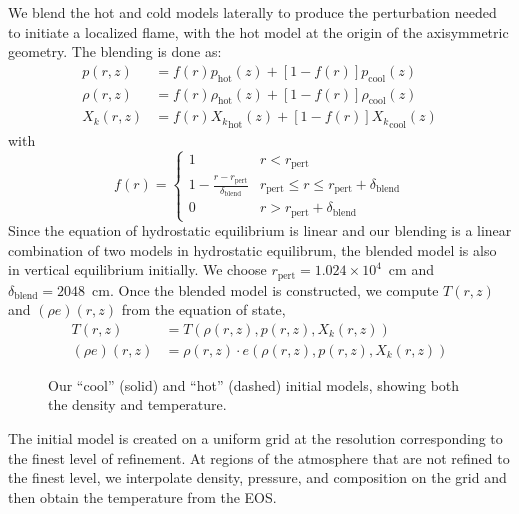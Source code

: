 \documentclass[trackchanges,preprint,times,tighten]{aastex63}
\begin{document}
We blend the hot and cold models laterally to produce the perturbation
needed to initiate a localized flame, with the hot model at the
origin of the axisymmetric geometry.  The blending is done as:
\begin{align}
p(r,z) &= f(r) p_\mathrm{hot}(z) + [1-f(r)] p_\mathrm{cool}(z) \\
\rho(r,z) &= f(r) \rho_\mathrm{hot}(z) + [1-f(r)] \rho_\mathrm{cool}(z) \\
X_k(r,z) &= f(r) {X_k}_\mathrm{hot}(z) + [1-f(r)] {X_k}_\mathrm{cool}(z)
\end{align}
with
\begin{equation}
f(r) = \begin{cases}
     1 & r < r_\mathrm{pert} \\
   1 - \frac{r - r_\mathrm{pert}}{\delta_\mathrm{blend}} & r_\mathrm{pert} \le r \le r_\mathrm{pert} + \delta_\mathrm{blend} \\
     0 & r > r_\mathrm{pert} + \delta_\mathrm{blend}
\end{cases}
\end{equation}
Since the equation of hydrostatic equilibrium is linear and our
blending is a linear combination of two models in hydrostatic
equilibrum, the blended model is also in vertical equilibrium initially.  We choose
$r_\mathrm{pert} = 1.024\times 10^4$~cm and $\delta_\mathrm{blend} = 2048$~cm.  Once
the blended model is constructed, we compute $T(r,z)$ and $(\rho e)(r,z)$
from the equation of state,
\begin{align}
  T(r,z) &= T(\rho(r,z), p(r,z), X_k(r,z)) \\
  (\rho e)(r,z) &= \rho(r, z) \cdot e(\rho(r,z), p(r,z), X_k(r,z)) 
\end{align}

\begin{figure}[t]
\centering
{}
\caption{\label{fig:initial_models} Our ``cool'' (solid) and ``hot''
  (dashed) initial models, showing both the density and temperature.}
\end{figure}

The initial model is created on a uniform grid at the resolution
corresponding to the finest level of refinement.  At regions of the
atmosphere that are not refined to the finest level, we interpolate
density, pressure, and composition on the grid and then obtain the
temperature from the EOS.  


\end{document}
